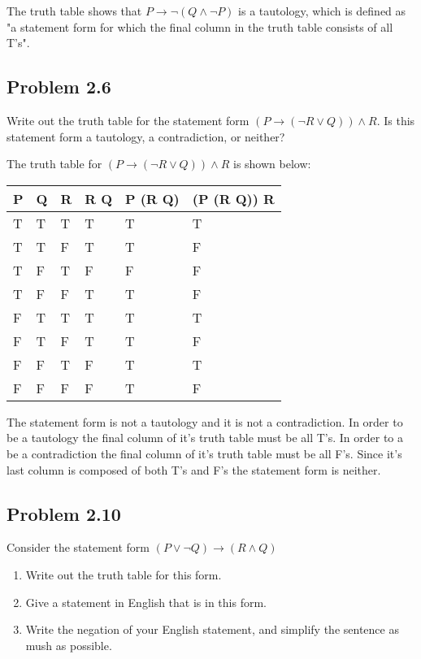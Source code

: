 \documentclass{article}
\begin{document}
The truth table shows that $ P \rightarrow \lnot(Q \land \lnot P) $ is a tautology, which is defined as "a statement form for which the final column in the truth table consists of all T's".


\newpage
\subsection{Problem 2.6}
Write out the truth table for the statement form $ (P \rightarrow (\lnot R \lor Q)) \land R $. Is this statement form a tautology, a contradiction, or neither?

The truth table for $ (P \rightarrow (\lnot R \lor Q)) \land R $ is shown below:

\begin{center}
	\begin{tabular}{ L L L | L | L | L }
		P & Q & R & \lnot R \lor Q & P \rightarrow (\lnot R \lor Q) &(P \rightarrow (\lnot R \lor Q)) \land R \\
		\hline
		T & T & T & T & T & T \\ 
		T & T & F & T & T & F \\  
		T & F & T & F & F & F \\
		T & F & F & T & T & F \\
		F & T & T & T & T & T \\ 
		F & T & F & T & T & F \\  
		F & F & T & F & T & T \\
		F & F & F & F & T & F 
	\end{tabular}
\end{center}

The statement form is not a tautology and it is not a contradiction. In order to be a tautology the final column of it's truth table must be all T's. In order to a be a contradiction the final column of it's truth table must be all F's. Since it's last column is composed of both T's and F's the statement form is neither.


\newpage
\subsection{Problem 2.10}
Consider the statement form $ (P \lor \lnot Q) \rightarrow (R \land Q) $
\renewcommand{\labelenumi}{(\alph{enumi})}
\begin{enumerate}
	\item Write out the truth table for this form.
	\item Give a statement in English that is in this form.
	\item Write the negation of your English statement, and simplify the sentence as mush as possible.
\end{enumerate}
\end{document}
